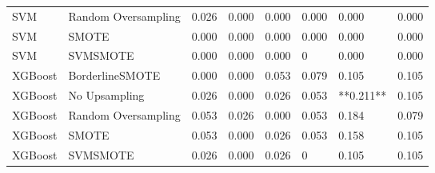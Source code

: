 \begin{tabular}{llllllll}
                         SVM & Random Oversampling & 0.026 &                     0.000 &                 0.000 &                  0.000 &                                   0.000 &    0.000 \\
                         SVM &               SMOTE & 0.000 &                     0.000 &                 0.000 &                  0.000 &                                   0.000 &    0.000 \\
                         SVM &            SVMSMOTE & 0.000 &                     0.000 &                 0.000 &                      0 &                                   0.000 &    0.000 \\
                     XGBoost &     BorderlineSMOTE & 0.000 &                     0.000 &                 0.053 &                  0.079 &                                   0.105 &    0.105 \\
                     XGBoost &       No Upsampling & 0.026 &                     0.000 &                 0.026 &                  0.053 &                               **0.211** &    0.105 \\
                     XGBoost & Random Oversampling & 0.053 &                     0.026 &                 0.000 &                  0.053 &                                   0.184 &    0.079 \\
                     XGBoost &               SMOTE & 0.053 &                     0.000 &                 0.026 &                  0.053 &                                   0.158 &    0.105 \\
                     XGBoost &            SVMSMOTE & 0.026 &                     0.000 &                 0.026 &                      0 &                                   0.105 &    0.105 \\
\bottomrule
\end{tabular}
